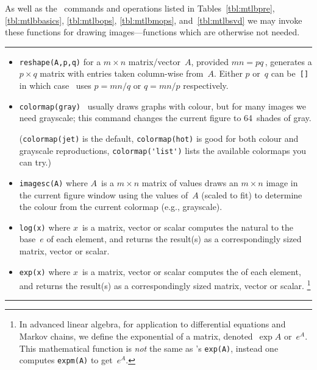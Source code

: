\begin{table}
\caption{As well as the \script\ commands and operations listed in Tables~\ref{tbl:mtlbpre}, \ref{tbl:mtlbbasics}, \ref{tbl:mtlbops}, \ref{tbl:mtlbmops}, and~\ref{tbl:mtlbsvd}  we may invoke these functions for drawing images---functions which are otherwise not needed.} \label{tbl:mtlbimag}
\hrule
\begin{minipage}{\linewidth}
\begin{itemize}

\item {}\verb|reshape(A,p,q)| for a \(m\times n\) matrix\slash vector~\(A\), provided \(mn=pq\)\,, generates a \(p\times q\) matrix with entries taken column-wise from~\(A\).  
Either \(p\) or~\(q\) can be~\verb|[]| in which case \script\ uses \(p=mn/q\) or \(q=mn/p\) respectively.

\item {}\verb|colormap(gray)| \script\ usually draws graphs with colour, but for many images we need grayscale; this command changes the current figure to 64~shades of gray.  

(\verb|colormap(jet)| is the default, \verb|colormap(hot)| is good for both colour and grayscale reproductions, \verb|colormap('list')| lists the available colormaps you can try.)

\item {}\verb|imagesc(A)| where \(A\)~is a \(m\times n\) matrix of values draws an \(m\times n\) image in the current figure window using the values of~\(A\) (scaled to fit) to determine the colour from the current colormap (e.g., grayscale).

\item {}\verb|log(x)| where \(x\)~is a  matrix, vector or scalar computes the natural  to the base~\(e\) of each element, and returns the result(s) as a correspondingly sized matrix, vector or scalar.

\item {}\verb|exp(x)| where \(x\)~is a  matrix, vector or scalar computes the  of each element, and returns the result(s) as a correspondingly sized matrix, vector or scalar.%
\footnote{In advanced linear algebra, for application to differential equations and Markov chains, we define the exponential of a matrix, denoted~\(\exp A\) or~\(e^A\).  
This mathematical function is \emph{not} the same as \script's \texttt{exp(A)}, instead one computes \texttt{expm(A)} to get~\(e^A\).}

\end{itemize}
\end{minipage}
\hrule
\end{table}










